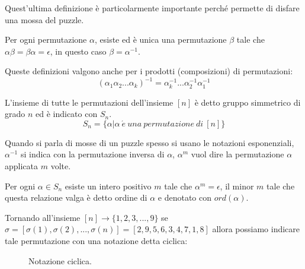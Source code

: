 Quest'ultima definizione è particolarmente importante perché permette di disfare una mossa del puzzle.

\begin{definition}
    Per ogni permutazione $\alpha$, esiste ed è unica una permutazione $\beta$ tale che $\alpha\beta = \beta\alpha = \epsilon$, in questo caso $\beta = \alpha^{-1}$. 
\end{definition}

Queste definizioni valgono anche per i prodotti (composizioni) di permutazioni: 
$$
(\alpha_1 \alpha_2...\alpha_k)^{-1} = \alpha_k^{-1}...\alpha_2^{-1}\alpha_1^{-1}
$$

\begin{definition}
L'insieme di tutte le permutazioni dell'insieme $[n]$ è detto gruppo simmetrico di grado $n$ ed è indicato con $S_n$. 
$$
S_n = \{\alpha | \alpha \ \acute{e} \ una \ permutazione \ di \ [n]\}
$$   
\end{definition}

Quando si parla di mosse di un puzzle spesso si usano le notazioni esponenziali, $\alpha^{-1}$ si indica con la permutazione inversa di $\alpha$, $\alpha^m$ vuol dire la permutazione $\alpha$ applicata $m$ volte.

\begin{definition}
    Per ogni $\alpha \in S_n$ esiste un intero positivo $m$ tale che $\alpha^m=\epsilon$, il minor $m$ tale che questa relazione valga è detto ordine di $\alpha$ e denotato con $ord(\alpha)$. 
\end{definition}

Tornando all'insieme $[n]\rightarrow \{1,2,3,...,9\}$ se $
\sigma = [\sigma(1),\sigma(2),...,\sigma(n)] = [2,9,5,6,3,4,7,1,8]
$ allora possiamo indicare tale permutazione con una notazione detta ciclica: 

\begin{figure}[h]
\begin{center}
\end{center}
\caption{Notazione ciclica.}
\label{fig:notCiclica}
\end{figure}


